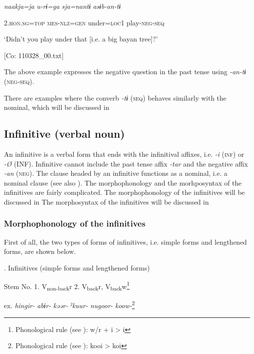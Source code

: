     \textit{naakja=ja}  \textit{u-rɨ=ga}  \textit{sja=nantɨ}  \textit{asɨb-an-tɨ}

    2.\textsc{hon}.\textsc{sg}=\textsc{top}  \textsc{mes}-\textsc{nlz}=\textsc{gen}  under=\textsc{loc}1  play-\textsc{neg}-\textsc{seq}

    ‘Didn’t you play under that [i.e. a big bayan tree]?’

    [Co: 110328\_00.txt]

The above example expresses the negative question in the past tense using \textit{{}-an-tɨ} (\textsc{neg}-\textsc{seq}).

  There are examples where the converb \textit{{}-tɨ} (\textsc{seq}) behaves similarly with the nominal, which will be discussed in 

\subsection{Infinitive (verbal noun)}

An infinitive is a verbal form that ends with the infinitival affixes, i.e. \textit{{}-i} (\textsc{inf}) or \textit{{}-Ø} (INF). Infinitive cannot include the past tense affix \textit{{}-tar} and the negative affix \textit{{}-an} (\textsc{neg}). The clause headed by an infinitive functions as a nominal, i.e. a nominal clause (see also ). The morphophonology and the morhposyntax of the infinitives are fairly complicated. The morphophonology of the infinitives will be discussed in  The morphosyntax of the infinitives will be discussed in 

\subsubsection{Morphophonology of the infinitives}

First of all, the two types of forms of infinitives, i.e. simple forms and lengthened forms, are shown below.

\begin{styleBeschriftung}
\textmd{. Infinitives (simple forms and lengthened forms)}
\end{styleBeschriftung}

Stem No.  1. V\textsubscript{non-back}r  2. V\textsubscript{back}r, V\textsubscript{back}w\footnote{Phonological rule (see ): w/r + i > i}

ex.  \textit{hingir-}  \textit{abɨr-}  \textit{kəər-}  \textit{ˀkuur-}  \textit{nugoor-}  \textit{koow-}\footnote{Phonological rule (see ): kooi > koi}

